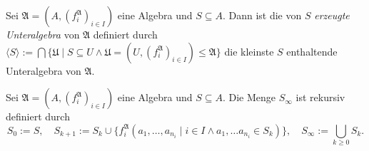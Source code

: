 \begin{corollary}
    Sei $\mathfrak{A}=(A,(f^\mathfrak{A}_i)_{i\in I})$ eine Algebra und $S\subseteq A$. Dann ist die von $S$ \emph{erzeugte Unteralgebra} von 
    $\mathfrak{A}$ definiert durch $\langle S\rangle:=\bigcap\{\mathfrak{U} \mid S\subseteq U\land \mathfrak{U} = (U,(f^\mathfrak{A}_i)_{i\in I})\le \mathfrak{A}\}$
    die kleinste $S$ enthaltende Unteralgebra von $\mathfrak{A}$.
\end{corollary}

\begin{definition}
    Sei $\mathfrak{A}=(A,(f^\mathfrak{A}_i)_{i\in I})$ eine Algebra und $S\subseteq A$. Die Menge $S_\infty$ ist rekursiv
    definiert durch
    \[S_0:=S, \quad S_{k+1}:=S_k\cup\{f^\mathfrak{A}_i(a_1,\ldots,a_{n_i} \mid i\in I\land a_1,\ldots a_{n_i}\in S_k)\},\quad S_\infty:=\bigcup_{k\geq 0}S_k.\]
\end{definition}

